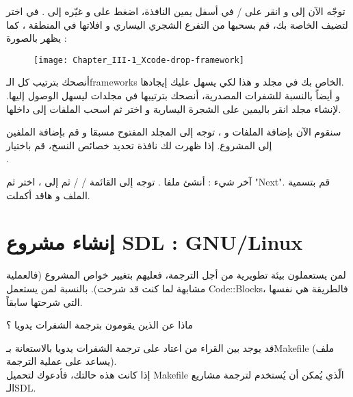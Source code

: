 توجّه الآن إلى 
و انقر على 
 / 
في أسفل يمين النافذة، اضغط على 
و غيّره إلى 
.
في 
اختر
لتضيف الخاصة بك، قم بسحبها من التفرع الشجري اليساري و افلاتها في المنطقة
،
كما يظهر بالصورة  :

\begin{figure}[H]
	\centering
	\texttt{[image: Chapter\_III-1\_Xcode-drop-framework]}
\end{figure}

أنصحك بترتيب كل الـ\textenglish{frameworks}
الخاص بك في مجلد 
و هذا لكي يسهل عليك إيجادها.\\
و أيضاً بالنسبة للشفرات المصدرية، أنصحك بترتيبها في مجلدات ليسهل الوصول إليها. لإنشاء مجلد انقر باليمين على الشجرة اليسارية و اختر
ثم اسحب الملفات إلى داخلها.

سنقوم الآن بإضافة الملفات
و 
،
توجه إلى المجلد 
المفتوح مسبقا و قم بإضافة الملفين إلى المشروع. إذا ظهرت لك نافذة تحديد خصائص النسخ، قم باختيار\\
.

آخر شيء : أنشئ ملفا
.
توجه إلى القائمة 
 /  / 
ثم إلى 
، 
اختر
ثم
"\textenglish{Next}".
قم بتسمية الملف و هاقد أكملت.

\section{إنشاء مشروع \textenglish{SDL} :  \textenglish{GNU/Linux}}

لمن يستعملون بيئة تطويرية من أجل الترجمة، فعليهم بتغيير خواص المشروع (فالعملية مشابهة لما كنت قد شرحت). بالنسبة لمن يستعمل
\textenglish{Code::Blocks}،
فالطريقة هي نفسها التي شرحتها سابقاً.

\begin{question}
 ماذا عن الذين يقومون بترجمة الشفرات يدويا ؟
\end{question}

قد يوجد بين القراء من اعتاد على ترجمة الشفرات يدويا بالاستعانة بـ\textenglish{Makefile}
(ملف يساعد على عملية الترجمة).\\
إذا كانت هذه حالتك، فأدعوك لتحميل
\textenglish{Makefile}
الّذي يُمكن أن يُستخدم لترجمة مشاريع الـ\textenglish{SDL}.

